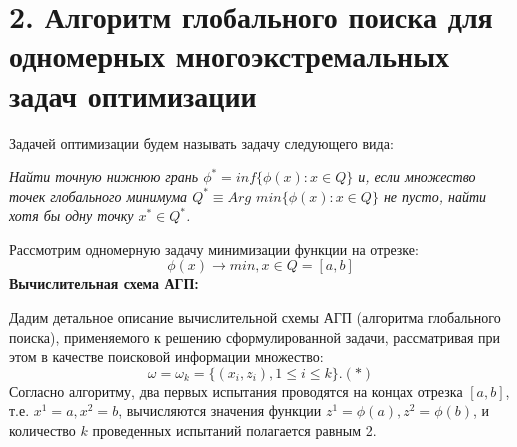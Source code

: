 \documentclass{report}
\begin{document}
\section*{2. Алгоритм глобального поиска для одномерных многоэкстремальных задач оптимизации}
Задачей оптимизации будем называть задачу следующего вида:

\textit{Найти точную нижнюю грань $\phi^*= inf \{ \phi(x):x\in Q\}$ и, если множество точек глобального минимума $Q^*\equiv Arg$ $min\{\phi(x): x \in Q\}$ не пусто, найти хотя бы одну точку $x^*\in Q^*$.}

Рассмотрим одномерную задачу минимизации функции на отрезке:
\begin{equation*}
\phi(x) \rightarrow min, x \in Q = [a,b]
\end{equation*}
\textbf{Вычислительная схема АГП:}

Дадим детальное описание вычислительной схемы АГП (алгоритма глобального поиска), применяемого к решению сформулированной задачи, рассматривая при этом в качестве поисковой информации множество:
\begin{equation*}
\omega = \omega_k = \{ (x_i, z_i), 1 \leq i \leq k \}.(*)
\end{equation*}
Согласно алгоритму, два первых испытания проводятся на концах отрезка $[a,b]$, т.е. $x^1=a, x^2=b$, вычисляются значения функции $z^1=\phi (a), z^2=\phi (b)$, и количество $k$ проведенных испытаний полагается равным 2.
\end{document}
